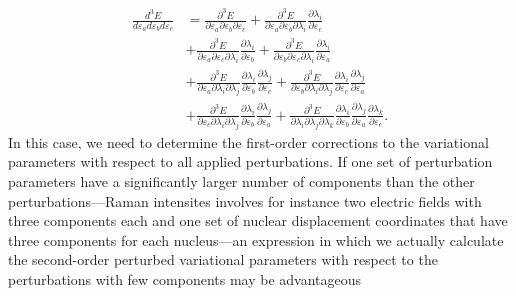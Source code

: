 \documentclass[%
 reprint,
 amsmath,amssymb,
 aps,
]{revtex4-1}
\begin{document}
\begin{align}
\label{eq:erg3}
\frac{d^{3}E}{d\varepsilon_ad\varepsilon_bd\varepsilon_c}
 & = 
\frac{\partial^{3}E}{\partial\varepsilon_a\partial\varepsilon_b\partial\varepsilon_c}+\frac{\partial^{3}E}{\partial\varepsilon_a\partial\varepsilon_b\partial\lambda_{i}}\frac{\partial\lambda_{i}}{\partial\varepsilon_c}
 \\ & \nonumber
 +\frac{\partial^{3}E}{\partial\varepsilon_a\partial\varepsilon_c\partial\lambda_{i}}\frac{\partial\lambda_{i}}{\partial\varepsilon_b}
 + 
 \frac{\partial^{3}E}{\partial\varepsilon_b\partial\varepsilon_c\partial\lambda_{i}}\frac{\partial\lambda_{i}}{\partial\varepsilon_a}\\\nonumber
& +
 \frac{\partial^{3}E}{\partial\varepsilon_a\partial\lambda_{i}\partial\lambda_{j}}\frac{\partial\lambda_{i}}{\partial\varepsilon_b}\frac{\partial\lambda_{j}}{\partial\varepsilon_c}
 +\frac{\partial^{3}E}{\partial\varepsilon_b\partial\lambda_{i}\partial\lambda_{j}}\frac{\partial\lambda_{i}}{\partial\varepsilon_c}\frac{\partial\lambda_{j}}{\partial\varepsilon_a}
  \\ & \nonumber +
 \frac{\partial^{3}E}{\partial\varepsilon_c\partial\lambda_{i}\partial\lambda_{j}}\frac{\partial\lambda_{i}}{\partial\varepsilon_b}\frac{\partial\lambda_{j}}{\partial\varepsilon_a}+\frac{\partial^{3}E}{\partial\lambda_{i}\partial\lambda_{j}\partial\lambda_{k}}\frac{\partial\lambda_{i}}{\partial\varepsilon_b}\frac{\partial\lambda_{j}}{\partial\varepsilon_a}\frac{\partial\lambda_{k}}{\partial\varepsilon_c}.\nonumber
\end{align}
In this case, we need to determine the first-order corrections to the
variational parameters with respect to all applied perturbations. If
one set of perturbation parameters have a significantly larger number
of components than the other perturbations---Raman intensites involves
for instance two electric fields with three components each and one
set of nuclear displacement coordinates that have three components for
each nucleus---an expression in which we actually calculate the
second-order perturbed variational parameters with respect to the
perturbations with few components may be advantageous
\end{document}
